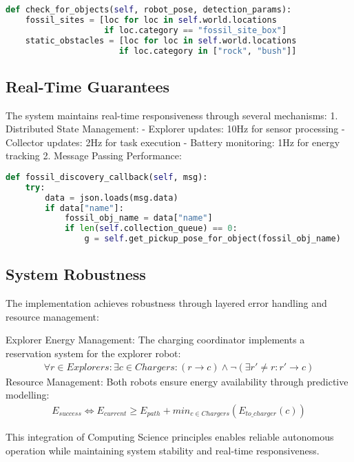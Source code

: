 \documentclass{csfourzero}
\begin{document}
\begin{lstlisting}[language=Python]
def check_for_objects(self, robot_pose, detection_params):
    fossil_sites = [loc for loc in self.world.locations 
                    if loc.category == "fossil_site_box"]
    static_obstacles = [loc for loc in self.world.locations 
                       if loc.category in ["rock", "bush"]]
\end{lstlisting}

\subsection{Real-Time Guarantees}
The system maintains real-time responsiveness through several mechanisms:
1. Distributed State Management:
   - Explorer updates: 10Hz for sensor processing
   - Collector updates: 2Hz for task execution
   - Battery monitoring: 1Hz for energy tracking
2. Message Passing Performance:

\begin{lstlisting}[language=Python]
def fossil_discovery_callback(self, msg):
    try:
        data = json.loads(msg.data)
        if data["name"]:
            fossil_obj_name = data["name"]
            if len(self.collection_queue) == 0:
                g = self.get_pickup_pose_for_object(fossil_obj_name)
\end{lstlisting}

\subsection{System Robustness}
The implementation achieves robustness through layered error handling and resource management:

Explorer Energy Management: The charging coordinator implements a reservation system for the explorer robot:
\begin{align*}
\forall r \in Explorers: \exists c \in Chargers: (r \rightarrow c) \land \neg(\exists r' \neq r: r' \rightarrow c)
\end{align*}
Resource Management: Both robots ensure energy availability through predictive modelling:
\begin{align*}
E_{success} \iff E_{current} \geq E_{path} + min_{c \in Chargers}(E_{to\_charger}(c))
\end{align*}

This integration of Computing Science principles enables reliable autonomous operation while maintaining system stability and real-time responsiveness.
\end{document}
